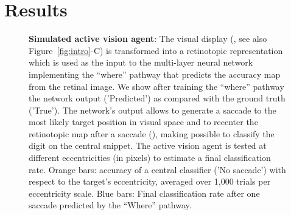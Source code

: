 \section{Results}
\label{sec:results}
\begin{figure}[t!]%
\caption{
{\bf Simulated active vision agent}:
\A The visual display (\DIS , see also Figure~\ref{fig:intro}-C) is transformed into a retinotopic representation which is used as the input to the multi-layer neural network implementing the ``where'' pathway that predicts the accuracy map from the retinal image. %
\B We show after training the ``where'' pathway the network output ('Predicted') as compared with the ground truth ('True'). %
\C The network's output allows to generate a saccade to the most likely target position in visual space and to recenter the retinotopic map after a saccade (\SAC ), making possible to classify the digit on the central snippet. %
\D The active vision agent is tested at different eccentricities (in pixels) to estimate a final classification rate. Orange bars: accuracy of a central classifier ('No saccade') with respect to the target's eccentricity, averaged over 1,000 trials per eccentricity scale. Blue bars: Final classification rate after one saccade predicted by the ``Where'' pathway. %
\label{fig:results}}%
\end{figure}%
